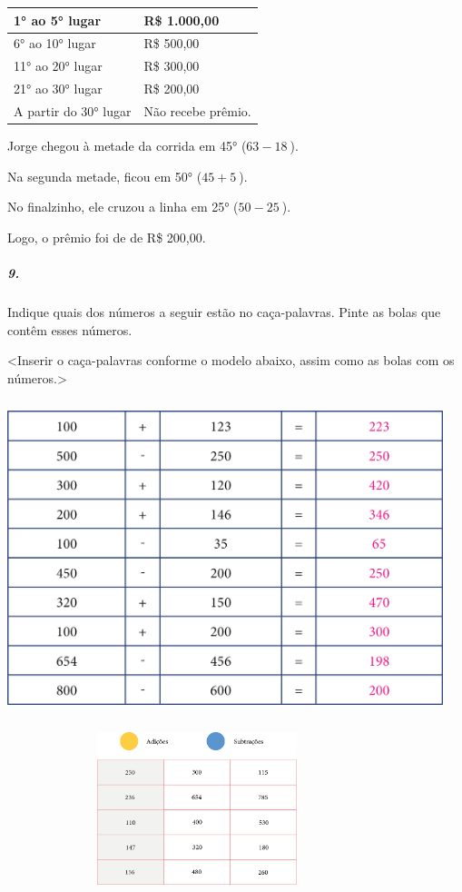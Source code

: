 \begin{longtable}[]{@{}ll@{}}
\toprule
1° ao 5° lugar & R\$ 1.000,00\tabularnewline
\midrule
\endhead
6° ao 10° lugar & R\$ 500,00\tabularnewline
11° ao 20° lugar & R\$ 300,00\tabularnewline
21° ao 30° lugar & R\$ 200,00\tabularnewline
A partir do 30° lugar & Não recebe prêmio.\tabularnewline
\bottomrule
\end{longtable}

Jorge chegou à metade da corrida em 45° (\(63 - 18\ \)).

Na segunda metade, ficou em 50° (\(45 + 5\ \)).

No finalzinho, ele cruzou a linha em 25° (\(50 - 25\ \)).

Logo, o prêmio foi de de R\$ 200,00.

\subparagraph{9. }\label{section-8}

Indique quais dos números a seguir estão no caça-palavras. Pinte
as bolas que contêm esses números.

\textless{}Inserir o caça-palavras conforme o modelo abaixo, assim como
as bolas com os números.\textgreater{}

\includegraphics[width=5.00000in,height=3.61458in]{media/image19.png}

\includegraphics[width=4.35417in,height=1.75000in]{media/image20.png}


